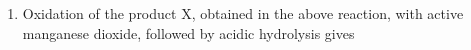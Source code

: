 \documentclass[journal,12pt,onecolumn]{IEEEtran}
\theoremstyle{remark}
\begin{document}
\begin{enumerate}[resume]
\begin{enumerate}
    \end{enumerate}
    \hfill{}



\item Oxidation of the product X, obtained in the above reaction, with active manganese dioxide, followed by acidic hydrolysis gives
    \begin{enumerate}
      \begin{multicols}{2}
        

\end{multicols}
\end{enumerate}
\end{enumerate}
\end{document}
